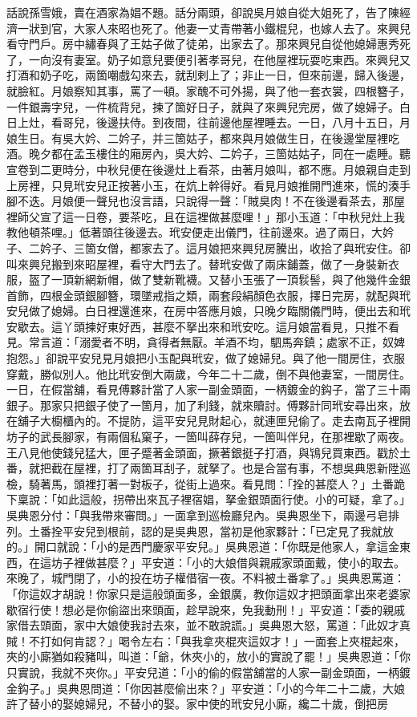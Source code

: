 \begin{showcontents}{}
話說孫雪娥，賣在酒家為娼不題。話分兩頭，卻說吳月娘自從大姐死了，告了陳經濟一狀到官，大家人來昭也死了。他妻一丈青帶著小鐵棍兒，也嫁人去了。來興兒看守門戶。房中繡春與了王姑子做了徒弟，出家去了。那來興兒自從他媳婦惠秀死了，一向沒有妻室。奶子如意兒要便引著孝哥兒，在他屋裡玩耍吃東西。來興兒又打酒和奶子吃，兩箇嘲戲勾來去，就刮剌上了；非止一日，但來前邊，歸入後邊，就臉紅。月娘察知其事，罵了一頓。家醜不可外揚，與了他一套衣裳，四根簪子，一件銀壽字兒，一件梳背兒，揀了箇好日子，就與了來興兒完房，做了媳婦子。白日上灶，看哥兒，後邊扶侍。到夜間，往前邊他屋裡睡去。一日，八月十五日，月娘生日。有吳大妗、二妗子，并三箇姑子，都來與月娘做生日，在後邊堂屋裡吃酒。晚夕都在孟玉樓住的廂房內，吳大妗、二妗子，三箇姑姑子，同在一處睡。聽宣卷到二更時分，中秋兒便在後邊灶上看茶，由著月娘叫，都不應。月娘親自走到上房裡，只見玳安兒正按著小玉，在炕上幹得好。看見月娘推開門進來，慌的湊手腳不迭。月娘便一聲兒也沒言語，只說得一聲：「賊臭肉！不在後邊看茶去，那屋裡師父宣了這一日卷，要茶吃，且在這裡做甚麼哩！」那小玉道：「中秋兒灶上我教他頓茶哩。」低著頭往後邊去。玳安便走出儀門，往前邊來。過了兩日，大妗子、二妗子、三箇女僧，都家去了。這月娘把來興兒房騰出，收拾了與玳安住。卻叫來興兒搬到來昭屋裡，看守大門去了。替玳安做了兩床鋪蓋，做了一身裝新衣服，盔了一頂新網新帽，做了雙新靴襪。又替小玉張了一頂䯼髻，與了他幾件金銀首飾，四根金頭銀腳簪，環墜戒指之類，兩套段絹顏色衣服，擇日完房，就配與玳安兒做了媳婦。白日裡還進來，在房中答應月娘，只晚夕臨關儀門時，便出去和玳安歇去。這丫頭揀好東好西，甚麼不拏出來和玳安吃。這月娘當看見，只推不看見。常言道：「溺愛者不明，貪得者無厭。羊酒不均，駟馬奔鎮；處家不正，奴婢抱怨。」卻說平安兒見月娘把小玉配與玳安，做了媳婦兒。與了他一間房住，衣服穿戴，勝似別人。他比玳安倒大兩歲，今年二十二歲，倒不與他妻室，一間房住。一日，在假當舖，看見傅夥計當了人家一副金頭面，一柄鍍金的鈎子，當了三十兩銀子。那家只把銀子使了一箇月，加了利錢，就來贖討。傅夥計同玳安尋出來，放在舖子大櫥櫃內的。不提防，這平安兒見財起心，就連匣兒偷了。走去南瓦子裡開坊子的武長腳家，有兩個私窠子，一箇叫薛存兒，一箇叫伴兒，在那裡歇了兩夜。王八見他使錢兒猛大，匣子蹙著金頭面，撅著銀挺子打酒，與鴇兒買東西。戳於土番，就把截在屋裡，打了兩箇耳刮子，就拏了。也是合當有事，不想吳典恩新陞巡檢，騎著馬，頭裡打著一對板子，從街上過來。看見問：「拴的甚麼人？」土番跪下稟說：「如此這般，拐帶出來瓦子裡宿娼，拏金銀頭面行使。小的可疑，拿了。」吳典恩分付：「與我帶來審問。」一面拿到巡檢廳兒內。吳典恩坐下，兩邊弓皂排列。土番拴平安兒到根前，認的是吳典恩，當初是他家夥計：「已定見了我就放的。」開口就說：「小的是西門慶家平安兒。」吳典恩道：「你既是他家人，拿這金東西，在這坊子裡做甚麼？」平安道：「小的大娘借與親戚家頭面戴，使小的取去。來晚了，城門閉了，小的投在坊子權借宿一夜。不料被土番拿了。」吳典恩罵道：「你這奴才胡說！你家只是這般頭面多，金銀廣，教你這奴才把頭面拿出來老婆家歇宿行使！想必是你偷盜出來頭面，趁早說來，免我動刑！」平安道：「委的親戚家借去頭面，家中大娘使我討去來，並不敢說謊。」吳典恩大怒，罵道：「此奴才真賊！不打如何肯認？」喝令左右：「與我拿夾棍夾這奴才！」一面套上夾棍起來，夾的小廝猶如殺豬叫，叫道：「爺，休夾小的，放小的實說了罷！」吳典恩道：「你只實說，我就不夾你。」平安兒道：「小的偷的假當舖當的人家一副金頭面，一柄鍍金鈎子。」吳典恩問道：「你因甚麼偷出來？」平安道：「小的今年二十二歲，大娘許了替小的娶媳婦兒，不替小的娶。家中使的玳安兒小廝，纔二十歲，倒把房
\end{showcontents}
